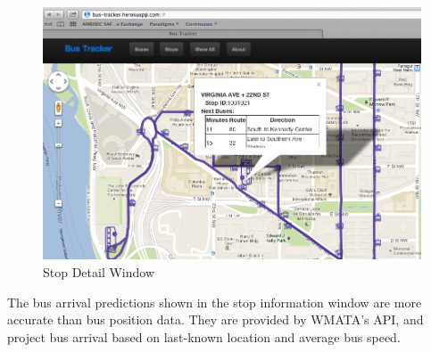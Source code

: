 \documentclass[12pt]{report}
\begin{document}
\begin{appendices}
\begin{figure}[ht]
  \centerline{\includegraphics[width=\textwidth]{stop-info-bubble.png}}
  \caption{Stop Detail Window}
  \label{fig:stop-details}
\end{figure}

The bus arrival predictions shown in the stop information window are more accurate than bus position data.  They are provided by WMATA's API, and project bus arrival based on last-known location and average bus speed.

\end{appendices}
\end{document}

